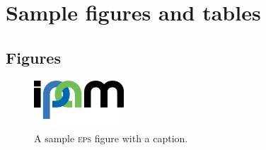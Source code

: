 \chapter{Sample figures and tables}\label{Ch:figures}

\section{Figures}

\begin{figure}[ht]
\begin{center}
\includegraphics[width=0.3\textwidth]{Graphics/ipamlogo.eps}
\end{center}
\caption{A sample \textsc{eps} figure with a caption.}\label{FIGURE:IPAM-logo-eps}
\end{figure} 


